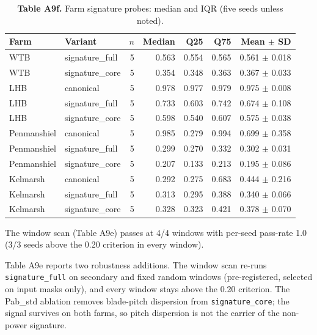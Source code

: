 \documentclass[
  journal]{IEEEtran}
\begin{document}
\begin{table}[!t]
\centering
\fontsize{8.0pt}{9.6pt}\selectfont
\setlength{\tabcolsep}{2.2pt}
\renewcommand{\arraystretch}{1.05}
\caption*{\textbf{Table A9f.} Farm signature probes: median and IQR (five seeds unless noted).}
\begin{tabular}{llrrrrr}
\toprule
Farm & Variant & $n$ & Median & Q25 & Q75 & Mean $\pm$ SD \\
\midrule
WTB & signature\_full & 5 & 0.563 & 0.554 & 0.565 & 0.561 $\pm$ 0.018 \\
WTB & signature\_core & 5 & 0.354 & 0.348 & 0.363 & 0.367 $\pm$ 0.033 \\
LHB & canonical & 5 & 0.978 & 0.977 & 0.979 & 0.975 $\pm$ 0.008 \\
LHB & signature\_full & 5 & 0.733 & 0.603 & 0.742 & 0.674 $\pm$ 0.108 \\
LHB & signature\_core & 5 & 0.598 & 0.540 & 0.607 & 0.575 $\pm$ 0.038 \\
Penmanshiel & canonical & 5 & 0.985 & 0.279 & 0.994 & 0.699 $\pm$ 0.358 \\
Penmanshiel & signature\_full & 5 & 0.299 & 0.270 & 0.332 & 0.302 $\pm$ 0.031 \\
Penmanshiel & signature\_core & 5 & 0.207 & 0.133 & 0.213 & 0.195 $\pm$ 0.086 \\
Kelmarsh & canonical & 5 & 0.292 & 0.275 & 0.683 & 0.444 $\pm$ 0.216 \\
Kelmarsh & signature\_full & 5 & 0.313 & 0.295 & 0.388 & 0.340 $\pm$ 0.066 \\
Kelmarsh & signature\_core & 5 & 0.328 & 0.323 & 0.421 & 0.378 $\pm$ 0.070 \\
\bottomrule
\end{tabular}
\vspace{1mm}
\fontsize{8.0pt}{9.6pt}\selectfont The window scan (Table A9e) passes at 4/4 windows with per-seed pass-rate 1.0 (3/3 seeds above the 0.20 criterion in every window).
\end{table}

Table A9e reports two robustness additions. The window scan re-runs
\texttt{signature\_full} on secondary and fixed random windows
(pre-registered, selected on input masks only), and every window stays
above the 0.20 criterion. The Pab\_std ablation removes blade-pitch
dispersion from \texttt{signature\_core}; the signal survives on both
farms, so pitch dispersion is not the carrier of the non-power
signature.
\end{document}
